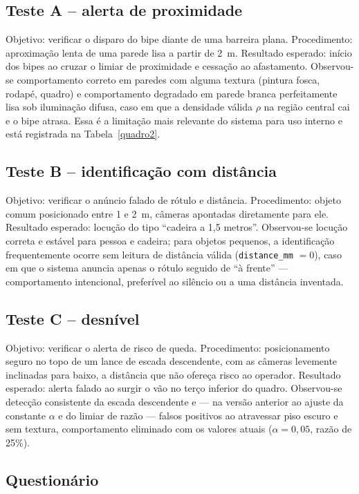 \documentclass[12pt]{article}
\begin{document}
\subsection{Teste A -- alerta de proximidade}

Objetivo: verificar o disparo do bipe diante de uma barreira plana.
Procedimento: aproximação lenta de uma parede lisa a partir de 2~m.
Resultado esperado: início dos bipes ao cruzar o limiar de proximidade e
cessação ao afastamento. Observou-se comportamento correto em paredes com
alguma textura (pintura fosca, rodapé, quadro) e comportamento degradado em
parede branca perfeitamente lisa sob iluminação difusa, caso em que a
densidade válida $\rho$ na região central cai e o bipe atrasa. Essa é a
limitação mais relevante do sistema para uso interno e está registrada na
Tabela~\ref{quadro2}.

\subsection{Teste B -- identificação com distância}

Objetivo: verificar o anúncio falado de rótulo e distância. Procedimento:
objeto comum posicionado entre 1 e 2~m, câmeras apontadas diretamente para
ele. Resultado esperado: locução do tipo ``cadeira a 1,5 metros''. Observou-se
locução correta e estável para pessoa e cadeira; para objetos pequenos, a
identificação frequentemente ocorre sem leitura de distância válida
(\texttt{distance\_mm} $= 0$), caso em que o sistema anuncia apenas o rótulo
seguido de ``à frente'' --- comportamento intencional, preferível ao silêncio
ou a uma distância inventada.

\subsection{Teste C -- desnível}

Objetivo: verificar o alerta de risco de queda. Procedimento: posicionamento
seguro no topo de um lance de escada descendente, com as câmeras levemente
inclinadas para baixo, a distância que não ofereça risco ao operador.
Resultado esperado: alerta falado ao surgir o vão no terço inferior do quadro.
Observou-se detecção consistente da escada descendente e --- na versão
anterior ao ajuste da constante $\alpha$ e do limiar de razão --- falsos
positivos ao atravessar piso escuro e sem textura, comportamento eliminado
com os valores atuais ($\alpha = 0{,}05$, razão de 25\%).

\subsection{Questionário}
\end{document}
